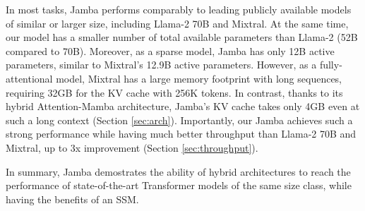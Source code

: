\documentclass{article}
\def\jamba{Jamba\xspace}
\begin{document}
In most tasks, \jamba performs comparably to leading publicly available models of similar or larger size, including Llama-2 70B and Mixtral. At the same time, our model has a smaller number of total available parameters than Llama-2 (52B compared to 70B). Moreover, as a sparse model, \jamba has only 12B active parameters, similar to Mixtral's 12.9B active parameters. However, as a fully-attentional model, Mixtral has a large memory footprint with long sequences, requiring 32GB for the KV cache with 256K tokens. In contrast, thanks to its hybrid Attention-Mamba architecture, \jamba's KV cache takes only 4GB even at such a long context (Section \ref{sec:arch}).
Importantly, our \jamba achieves such a strong performance while having much better throughput than Llama-2 70B and Mixtral, up to 3x improvement (Section \ref{sec:throughput}). 

In summary, \jamba demostrates the ability of hybrid architectures to reach the performance of state-of-the-art Transformer models of the same size class, while having the benefits of an SSM.
\end{document}
